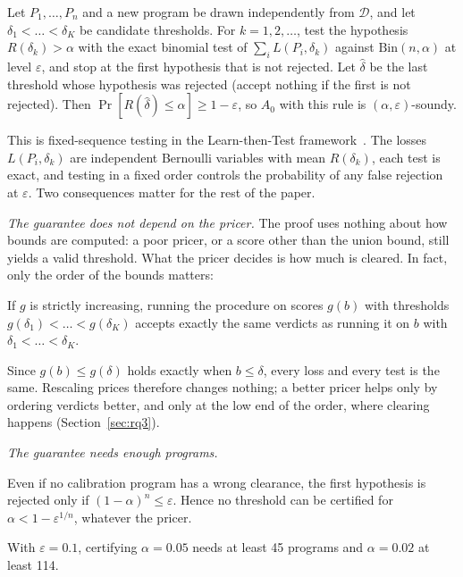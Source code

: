 \begin{proposition}\label{prop:ltt}
Let $P_1,\dots,P_n$ and a new program be drawn independently from $\mathcal{D}$, and let $\delta_1<\dots<\delta_K$ be candidate thresholds.
For $k=1,2,\dots$, test the hypothesis $R(\delta_k)>\alpha$ with the exact binomial test of $\sum_i L(P_i,\delta_k)$ against $\mathrm{Bin}(n,\alpha)$ at level $\varepsilon$, and stop at the first hypothesis that is not rejected.
Let $\hat\delta$ be the last threshold whose hypothesis was rejected (accept nothing if the first is not rejected).
Then $\Pr[R(\hat\delta)\le\alpha]\ge 1-\varepsilon$, so $A_0$ with this rule is $(\alpha,\varepsilon)$-soundy.
\end{proposition}
\noindent This is fixed-sequence testing in the Learn-then-Test framework~\cite{lt}.
The losses $L(P_i,\delta_k)$ are independent Bernoulli variables with mean $R(\delta_k)$, each test is exact, and testing in a fixed order controls the probability of any false rejection at $\varepsilon$.
Two consequences matter for the rest of the paper.

\emph{The guarantee does not depend on the pricer.}
The proof uses nothing about how bounds are computed: a poor pricer, or a score other than the union bound, still yields a valid threshold.
What the pricer decides is how much is cleared.
In fact, only the order of the bounds matters:
\begin{proposition}\label{prop:order}
If $g$ is strictly increasing, running the procedure on scores $g(b)$ with thresholds $g(\delta_1)<\dots<g(\delta_K)$ accepts exactly the same verdicts as running it on $b$ with $\delta_1<\dots<\delta_K$.
\end{proposition}
\noindent Since $g(b)\le g(\delta)$ holds exactly when $b\le\delta$, every loss and every test is the same.
Rescaling prices therefore changes nothing; a better pricer helps only by ordering verdicts better, and only at the low end of the order, where clearing happens (Section~\ref{sec:rq3}).

\emph{The guarantee needs enough programs.}
\begin{corollary}\label{cor:n}
Even if no calibration program has a wrong clearance, the first hypothesis is rejected only if $(1-\alpha)^n\le\varepsilon$.
Hence no threshold can be certified for $\alpha<1-\varepsilon^{1/n}$, whatever the pricer.
\end{corollary}
\noindent With $\varepsilon=0.1$, certifying $\alpha=0.05$ needs at least 45 programs and $\alpha=0.02$ at least 114.

